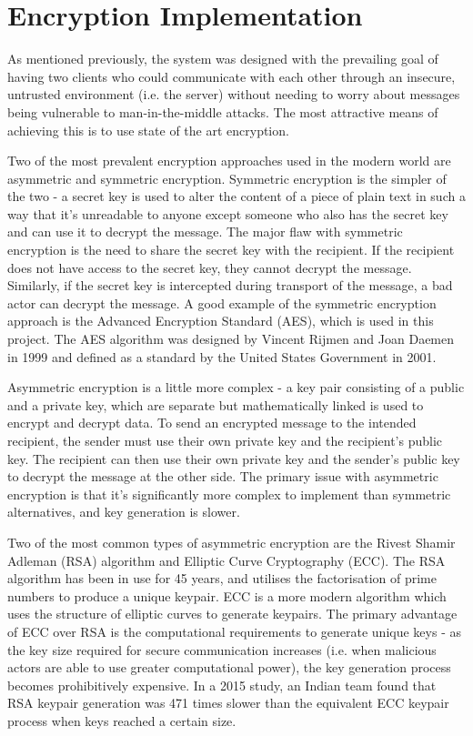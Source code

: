 \documentclass{mproj}
\begin{document}
\section{Encryption Implementation}\label{encryption}
As mentioned previously, the system was designed with the prevailing goal of having two clients who could communicate with each other through an insecure, untrusted environment (i.e. the server) without needing to worry about messages being vulnerable to man-in-the-middle attacks\cite{mallik2019man}. The most attractive means of achieving this is to use state of the art encryption.

Two of the most prevalent encryption approaches used in the modern world are asymmetric and symmetric encryption. Symmetric encryption is the simpler of the two - a secret key is used to alter the content of a piece of plain text in such a way that it's unreadable to anyone except someone who also has the secret key and can use it to decrypt the message. The major flaw with symmetric encryption is the need to share the secret key with the recipient. If the recipient does not have access to the secret key, they cannot decrypt the message. Similarly, if the secret key is intercepted during transport of the message, a bad actor can decrypt the message. A good example of the symmetric encryption approach is the Advanced Encryption Standard (AES), which is used in this project. The AES algorithm was designed by Vincent Rijmen and Joan Daemen in 1999 and defined as a standard by the United States Government in 2001.

Asymmetric encryption is a little more complex - a key pair consisting of a public and a private key, which are separate but mathematically linked is used to encrypt and decrypt data. To send an encrypted message to the intended recipient, the sender must use their own private key and the recipient's public key. The recipient can then use their own private key and the sender's public key to decrypt the message at the other side. The primary issue with asymmetric encryption is that it's significantly more complex to implement than symmetric alternatives, and key generation is slower.

Two of the most common types of asymmetric encryption are the Rivest Shamir Adleman (RSA) algorithm\cite{rivest2019method} and Elliptic Curve Cryptography (ECC)\cite{lopez2000overview}. The RSA algorithm has been in use for 45 years, and utilises the factorisation of prime numbers to produce a unique keypair. ECC is a more modern algorithm which uses the structure of elliptic curves to generate keypairs. The primary advantage of ECC over RSA is the computational requirements to generate unique keys - as the key size required for secure communication increases (i.e. when malicious actors are able to use greater computational power), the key generation process becomes prohibitively expensive. In a 2015 study, an Indian team found that RSA keypair generation was 471 times slower than the equivalent ECC keypair process when keys reached a certain size\cite{gobi2015comparative}.
\end{document}

